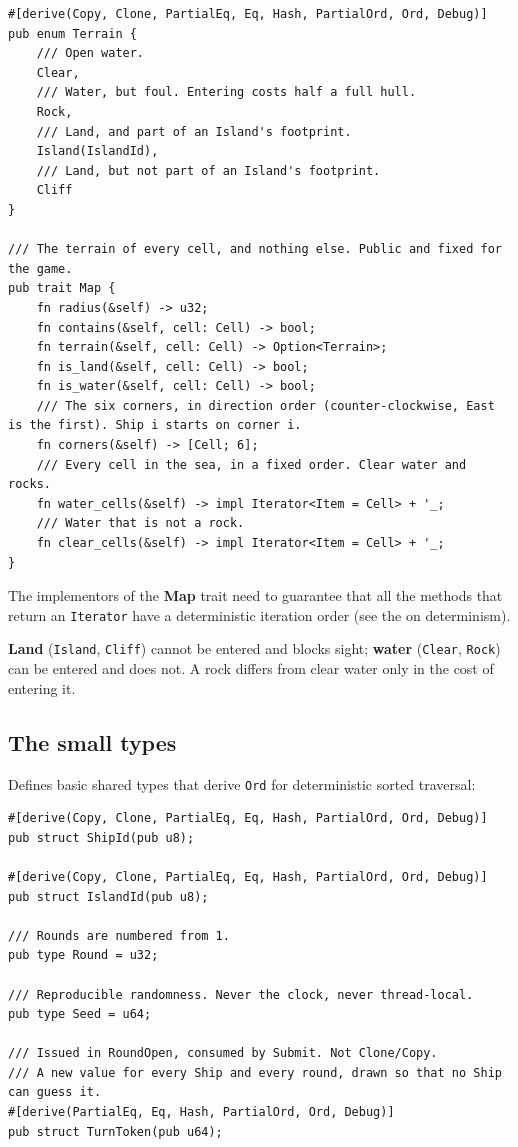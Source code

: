 \documentclass{article}
\begin{document}
\begin{lstlisting}
#[derive(Copy, Clone, PartialEq, Eq, Hash, PartialOrd, Ord, Debug)]
pub enum Terrain {
    /// Open water.
    Clear,
    /// Water, but foul. Entering costs half a full hull.
    Rock,
    /// Land, and part of an Island's footprint.
    Island(IslandId),
    /// Land, but not part of an Island's footprint.
    Cliff
}

/// The terrain of every cell, and nothing else. Public and fixed for the game.
pub trait Map {
    fn radius(&self) -> u32;
    fn contains(&self, cell: Cell) -> bool;
    fn terrain(&self, cell: Cell) -> Option<Terrain>;
    fn is_land(&self, cell: Cell) -> bool;
    fn is_water(&self, cell: Cell) -> bool;
    /// The six corners, in direction order (counter-clockwise, East is the first). Ship i starts on corner i.
    fn corners(&self) -> [Cell; 6];
    /// Every cell in the sea, in a fixed order. Clear water and rocks.
    fn water_cells(&self) -> impl Iterator<Item = Cell> + '_;
    /// Water that is not a rock.
    fn clear_cells(&self) -> impl Iterator<Item = Cell> + '_;
}
\end{lstlisting}

The implementors of the \textbf{Map} trait need to guarantee that all the methods that return an \texttt{Iterator} have a deterministic iteration order (see the \MD{} on determinism).

\textbf{Land} (\texttt{Island}, \texttt{Cliff}) cannot be entered and blocks sight; \textbf{water} (\texttt{Clear}, \texttt{Rock}) can be entered and does not. A rock differs from clear water only in the cost of entering it.

\subsection{The small types}
\label{proto:types}

Defines basic shared types that derive \texttt{Ord} for deterministic sorted traversal:

\begin{lstlisting}
#[derive(Copy, Clone, PartialEq, Eq, Hash, PartialOrd, Ord, Debug)]
pub struct ShipId(pub u8);

#[derive(Copy, Clone, PartialEq, Eq, Hash, PartialOrd, Ord, Debug)]
pub struct IslandId(pub u8);

/// Rounds are numbered from 1.
pub type Round = u32;

/// Reproducible randomness. Never the clock, never thread-local.
pub type Seed = u64;

/// Issued in RoundOpen, consumed by Submit. Not Clone/Copy.
/// A new value for every Ship and every round, drawn so that no Ship can guess it.
#[derive(PartialEq, Eq, Hash, PartialOrd, Ord, Debug)]
pub struct TurnToken(pub u64);
\end{lstlisting}
\end{document}
